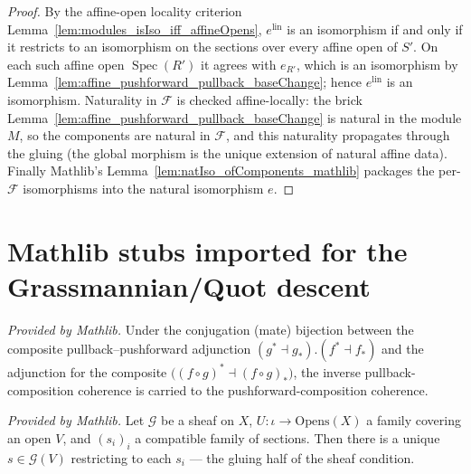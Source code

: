 \begin{proof}
  By the affine-open locality criterion
  Lemma~\ref{lem:modules_isIso_iff_affineOpens}, \(e^{\mathrm{lin}}\) is an isomorphism
  if and only if it restricts to an isomorphism on the sections over every affine open
  of \(S'\). On each such affine open \(\operatorname{Spec}(R')\) it agrees with
  \(e_{R'}\), which is an isomorphism by
  Lemma~\ref{lem:affine_pushforward_pullback_baseChange}; hence \(e^{\mathrm{lin}}\) is
  an isomorphism. Naturality in \(\mathcal{F}\) is checked affine-locally: the brick
  Lemma~\ref{lem:affine_pushforward_pullback_baseChange} is natural in the module
  \(M\), so the components are natural in \(\mathcal{F}\), and this naturality propagates
  through the gluing (the global morphism is the unique extension of natural affine
  data). Finally Mathlib's Lemma~\ref{lem:natIso_ofComponents_mathlib} packages the
  per-\(\mathcal{F}\) isomorphisms into the natural isomorphism \(e\).
\end{proof}

\section{Mathlib stubs imported for the Grassmannian/Quot descent}
\label{sec:fbc_gr_union_stubs}

\begin{lemma}
  \label{lem:conjugateEquiv_pullbackComp_inv_mathlib}
  \mathlibok
  \textit{Provided by Mathlib.}
  Under the conjugation (mate) bijection between the composite pullback--pushforward
  adjunction \((g^{*}\dashv g_{*}) . (f^{*}\dashv f_{*})\) and the adjunction for the
  composite \(\bigl((f\circ g)^{*} \dashv (f\circ g)_{*}\bigr)\), the inverse
  pullback-composition coherence is carried to the pushforward-composition coherence.
\end{lemma}

\begin{lemma}
  \label{lem:sheaf_existsUnique_gluing_mathlib}
  \mathlibok
  \textit{Provided by Mathlib.}
  Let \(\mathcal{G}\) be a sheaf on \(X\), \(U : \iota \to \mathrm{Opens}(X)\) a family covering an
  open \(V\), and \((s_i)_i\) a compatible family of sections. Then there is a unique
  \(s \in \mathcal{G}(V)\) restricting to each \(s_i\) --- the gluing half of the sheaf condition.
\end{lemma}
